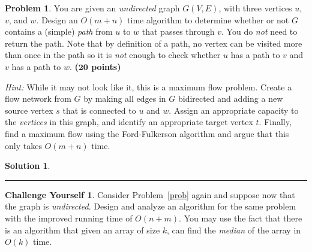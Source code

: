 \documentclass{article}
\theoremstyle{definition}
\newtheorem{problem}{Problem}
\newtheorem*{challenge}{Challenge Yourself}
\def\fline{\rule{0.75\linewidth}{0.5pt}}
\newcommand{\finishline}{\vspace{-15pt}\begin{center}\fline\end{center}}
\newtheorem*{solution*}{Solution}
\newenvironment{solution}{\begin{solution*}}{{\finishline} \end{solution*}}
\newcommand{\grade}[1]{\hfill{\textbf{($\mathbf{#1}$ points)}}}
\begin{document}
\begin{problem}
	You are given an \emph{undirected} graph $G(V, E)$, with three vertices $u$, $v$, and $w$. Design an
$O(m+n)$ time algorithm to determine whether or not $G$ contains a (simple) \emph{path} from $u$ to $w$ that passes through $v$. 
You do \emph{not} need to return the path. Note that by definition of a path, no vertex can be visited more than once in the path so it is \emph{not} enough to check whether $u$
has a path to $v$ and $v$ has a path to $w$. 
\grade{20}

\emph{Hint:} While it may not look like it, this is a maximum flow problem. Create a flow network from $G$ by making all edges in $G$ bidirected and adding a new source vertex $s$ that is connected to $u$ and $w$.  Assign an appropriate capacity to the {\em vertices} in this graph, and identify an appropriate target vertex $t$. Finally, find a maximum flow using the Ford-Fulkerson algorithm and argue that this only takes $O(m+n)$ time. 
\end{problem}

\begin{solution}
	
\end{solution}


\begin{challenge}
	Consider Problem~\ref{prob} again and suppose now that the graph is \emph{undirected}. Design and analyze an algorithm for the same problem with the improved running time of $O(n+m)$. You may use the fact that there is an algorithm 
	that given an array of size $k$, can find the \emph{median} of the array in $O(k)$ time. 
\end{challenge}
\end{document}
